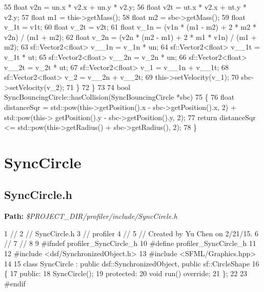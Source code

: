 \begin{DoxyCodeInclude}
55         \textcolor{keywordtype}{float} v2n = un.x * v2.x + un.y * v2.y;
56         \textcolor{keywordtype}{float} v2t = ut.x * v2.x + ut.y * v2.y;
57         \textcolor{keywordtype}{float} m1 = this->getMass();
58         \textcolor{keywordtype}{float} m2 = sbc->getMass();
59         \textcolor{keywordtype}{float} v\_1t = v1t;
60         \textcolor{keywordtype}{float} v\_2t = v2t;
61         \textcolor{keywordtype}{float} v\_1n = (v1n * (m1 - m2) + 2 * m2 * v2n) / (m1 + m2);
62         \textcolor{keywordtype}{float} v\_2n = (v2n * (m2 - m1) + 2 * m1 * v1n) / (m1 + m2);
63         sf::Vector2<float> v\_\_1n = v\_1n * un;
64         sf::Vector2<float> v\_\_1t = v\_1t * ut;
65         sf::Vector2<float> v\_\_2n = v\_2n * un;
66         sf::Vector2<float> v\_\_2t = v\_2t * ut;
67         sf::Vector2<float> v\_1 = v\_\_1n + v\_\_1t;
68         sf::Vector2<float> v\_2 = v\_\_2n + v\_\_2t;
69         this->setVelocity(v\_1);
70         sbc->setVelocity(v\_2);
71     \}
72 \}
73 
74 \textcolor{keywordtype}{bool} SyncBouncingCircle::hasCollision(SyncBouncingCircle *sbc)
75 \{
76     \textcolor{keywordtype}{float} distanceSqr = std::pow(this->getPosition().x - sbc->getPosition().x, 2) + std::pow(this->
      getPosition().y - sbc->getPosition().y, 2);
77     \textcolor{keywordflow}{return} distanceSqr <= std::pow(this->getRadius() + sbc->getRadius(), 2);
78 \}
\end{DoxyCodeInclude}
 \hypertarget{_benchmark_program_BenchmarkProgramSyncCircle}{}\section{Sync\+Circle}\label{_benchmark_program_BenchmarkProgramSyncCircle}
\hypertarget{_benchmark_program_BenchmarkProgramSyncCircle_h}{}\subsection{Sync\+Circle.\+h}\label{_benchmark_program_BenchmarkProgramSyncCircle_h}
{\bfseries Path\+:} {\itshape \$\+P\+R\+O\+J\+E\+C\+T\+\_\+\+D\+I\+R/profiler/include/\+Sync\+Circle.h} 
\begin{DoxyCodeInclude}
1 \textcolor{comment}{//}
2 \textcolor{comment}{//  SyncCircle.h}
3 \textcolor{comment}{//  profiler}
4 \textcolor{comment}{//}
5 \textcolor{comment}{//  Created by Yu Chen on 2/21/15.}
6 \textcolor{comment}{//}
7 \textcolor{comment}{//}
8 
9 \textcolor{preprocessor}{#ifndef profiler\_SyncCircle\_h}
10 \textcolor{preprocessor}{#define profiler\_SyncCircle\_h}
11 
12 \textcolor{preprocessor}{#include <dsf/SynchronizedObject.h>}
13 \textcolor{preprocessor}{#include <SFML/Graphics.hpp>}
14 
15 \textcolor{keyword}{class }SyncCircle : \textcolor{keyword}{public} dsf::SynchronizedObject, \textcolor{keyword}{public} sf::CircleShape
16 \{
17 \textcolor{keyword}{public}:
18     SyncCircle();
19 \textcolor{keyword}{protected}:
20     \textcolor{keywordtype}{void} run() \textcolor{keyword}{override};
21 \};
22 
23 \textcolor{preprocessor}{#endif}
\end{DoxyCodeInclude}

